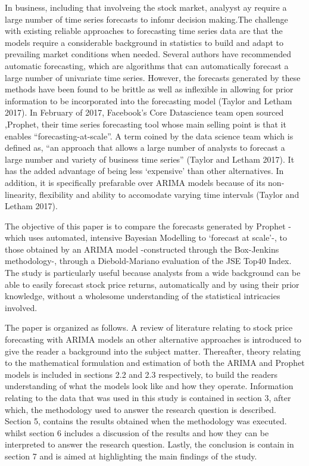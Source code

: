 \documentclass[12pt,a4paper]{article}
\numberwithin{equation}{section}
\numberwithin{figure}{section}
\numberwithin{table}{section}
\begin{document}
In business, including that involveing the stock market, analyyst ay
require a large number of time series forecasts to infomr decision
making.The challenge with existing reliable approaches to forecasting
time series data are that the models require a considerable background
in statistics to build and adapt to prevailing market conditions when
needed. Several authors have recommended automatic forecasting, which
are algorithms that can automatically forecast a large number of
univariate time series. However, the forecasts generated by these
methods have been found to be brittle as well as inflexible in allowing
for prior information to be incorporated into the forecasting model
(Taylor and Letham 2017). In February of 2017, Facebook's Core
Datascience team open sourced ,Prophet, their time series forecasting
tool whose main selling point is that it enables
``forecasting-at-scale''. A term coined by the data science team which
is defined as, ``an approach that allows a large number of analysts to
forecast a large number and variety of business time series'' (Taylor
and Letham 2017). It has the added advantage of being less `expensive'
than other alternatives. In addition, it is specifically prefarable over
ARIMA models because of its non-linearity, flexibility and ability to
accomodate varying time intervals (Taylor and Letham 2017).

The objective of this paper is to compare the forecasts generated by
Prophet - which uses automated, intensive Bayesian Modelling to
`forecast at scale'-, to those obtained by an ARIMA model -constructed
through the Box-Jenkins methodology-, through a Diebold-Mariano
evaluation of the JSE Top40 Index. The study is particularly useful
because analysts from a wide background can be able to easily forecast
stock price returns, automatically and by using their prior knowledge,
without a wholesome understanding of the statistical intricacies
involved.

The paper is organized as follows. A review of literature relating to
stock price forecasting with ARIMA models an other alternative
approaches is introduced to give the reader a background into the
subject matter. Thereafter, theory relating to the mathematical
formulation and estimation of both the ARIMA and Prophet models is
included in sections 2.2 and 2.3 respectively, to build the readers
understanding of what the models look like and how they operate.
Information relating to the data that was used in this study is
contained in section 3, after which, the methodology used to answer the
research question is described. Section 5, contains the results obtained
when the methodology was executed. whilst section 6 includes a
discussion of the results and how they can be interpreted to answer the
research question. Lastly, the conclusion is contain in section 7 and is
aimed at highlighting the main findings of the study.
\end{document}
